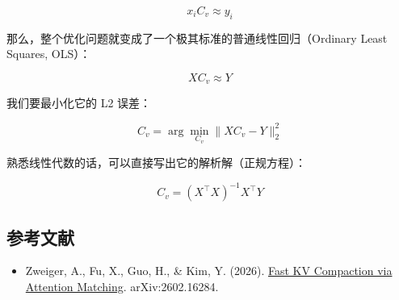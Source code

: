 \[
x_i C_v \approx y_i
\]

那么，整个优化问题就变成了一个极其标准的普通线性回归（Ordinary Least Squares, OLS）：

\[
XC_v \approx Y
\]

我们要最小化它的 L2 误差：

\[
C_v = \arg\min_{C_v}\|XC_v - Y\|_2^2
\]

熟悉线性代数的话，可以直接写出它的解析解（正规方程）：

\[
C_v = (X^\top X)^{-1}X^\top Y
\]

\hypertarget{ux53c2ux8003ux6587ux732e-135}{%
\subsection{参考文献}\label{ux53c2ux8003ux6587ux732e-135}}

\begin{itemize}
\tightlist
\item
  Zweiger, A., Fu, X., Guo, H., \& Kim, Y. (2026). \href{https://arxiv.org/abs/2602.16284}{Fast KV Compaction via Attention Matching}. arXiv:2602.16284.
\end{itemize}

\clearpage
